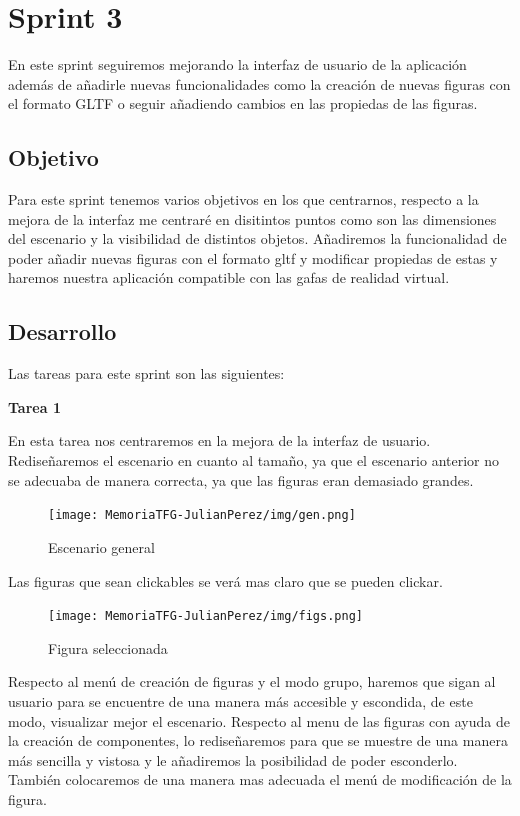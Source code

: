\documentclass[a4paper, 12pt]{book}
\begin{document}
\section{Sprint 3}

En este sprint seguiremos mejorando la interfaz de usuario de la aplicación además de añadirle nuevas funcionalidades como la creación de nuevas figuras con el formato GLTF o seguir añadiendo cambios en las propiedas de las figuras.

\subsection{Objetivo}
Para este sprint tenemos varios objetivos en los que centrarnos, respecto a la mejora de la interfaz me centraré en disitintos puntos como son las dimensiones del escenario y la visibilidad de distintos objetos. Añadiremos la funcionalidad de poder añadir nuevas figuras con el formato gltf y modificar propiedas de estas y haremos nuestra aplicación compatible con las gafas de realidad virtual.

\subsection{Desarrollo}
Las tareas para este sprint son las siguientes:

\textbf{Tarea 1}

En esta tarea nos centraremos en la mejora de la interfaz de usuario. Rediseñaremos el escenario en cuanto al tamaño, ya que el escenario anterior no se adecuaba de manera correcta, ya que las figuras eran demasiado grandes. 

\begin{figure}[H]
  \centering
  \texttt{[image: MemoriaTFG-JulianPerez/img/gen.png]}
  \caption{Escenario general}\label{gen}
\end{figure}

Las figuras que sean clickables se verá mas claro que se pueden clickar.
\begin{figure}[H]
  \centering
  \texttt{[image: MemoriaTFG-JulianPerez/img/figs.png]}
  \caption{Figura seleccionada}\label{scrum}
\end{figure}

Respecto al menú de creación de figuras y el modo grupo, haremos que sigan al usuario para se encuentre de una manera más accesible y escondida, de este modo, visualizar mejor el escenario. Respecto al menu de las figuras con ayuda de la creación de componentes, lo rediseñaremos para que se muestre de una manera más sencilla y vistosa y le añadiremos la posibilidad de poder esconderlo. También colocaremos de una manera mas adecuada el menú de modificación de la figura. 
\end{document}
